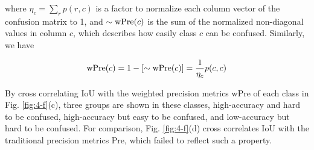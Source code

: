 \documentclass[journal]{IEEEtran}
\begin{document}
where $\eta_c = \sum_{r} p(r,c)$ is a factor to normalize each column vector of the confusion matrix to 1, and $\mathbf{\sim {\rm wPre}}(c)$ is the sum of the normalized non-diagonal values in column $c$, which describes how easily class $c$ can be confused. Similarly, we have

\begin{equation}
{\rm wPre}(c) = 1-[\mathbf{\sim {\rm wPre}}(c)] = \frac{1}{\eta_c}p(c,c)
\end{equation}

By cross correlating IoU with the weighted precision metrics wPre of each class in Fig. \ref{fig:4-f}(c), three groups are shown in these classes, high-accuracy and hard to be confused, high-accuracy but easy to be confused, and low-accuracy but hard to be confused. For comparison, Fig. \ref{fig:4-f}(d) cross correlates IoU with the traditional precision metrics Pre, which failed to reflect such a property.


%
%

\end{document}
